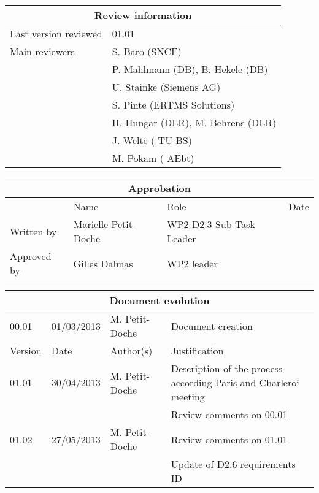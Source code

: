 \documentclass{template/openetcs_article}
\begin{document}
\begin{tabular}{|p{4.4cm}|p{8.7cm}|}
\hline
\multicolumn{2}{|c|}{Review information} \\
\hline
Last version reviewed & 01.01 \\
\hline
Main reviewers & S. Baro (SNCF) \\
& P. Mahlmann (DB), B. Hekele (DB)\\
& U. Stainke (Siemens AG) \\
& S. Pinte (ERTMS Solutions) \\
& H. Hungar (DLR), M. Behrens (DLR) \\
& J. Welte ( TU-BS) \\
& M. Pokam ( AEbt) \\
\hline
\end{tabular}

\begin{tabular}{|p{2.2cm}|p{4cm}|p{4cm}|p{2cm}|}
\hline
\multicolumn{4}{|c|}{Approbation} \\
\hline
  &  Name & Role & Date   \\
\hline  
Written by    &  Marielle Petit-Doche & WP2-D2.3 Sub-Task Leader  & \\
\hline
Approved by & Gilles Dalmas & WP2 leader & \\
\hline
\end{tabular}

\begin{tabular}{|p{2.2cm}|p{2cm}|p{3cm}|p{5cm}|}
\hline
\multicolumn{4}{|c|}{Document evolution} \\
\hline
00.01 & 01/03/2013 & M. Petit-Doche &  Document creation  \\
Version &  Date & Author(s) & Justification  \\
\hline  
01.01 & 30/04/2013 & M. Petit-Doche &  Description of the process according Paris and Charleroi meeting  \\
& & & Review comments on 00.01 \\
\hline  
01.02 & 27/05/2013 & M. Petit-Doche &  Review comments on 01.01 \\
& & & Update of D2.6 requirements ID \\
\hline  
\end{tabular}



\newcommand{\tbd}{\colorbox{cyan}{\%\%To Be Defined\%\%}}
\newcommand{\tbc}{\colorbox{cyan}{\%\%To Be Confirmed\%\%}}
\newcommand{\todo}[1]{\colorbox{cyan}{\%\%{#1}\%\%}}
\newlength{\origindent}
\end{document}
